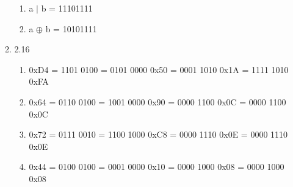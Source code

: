 \documentclass[11pt]{article}
\begin{document}
\begin{enumerate}
\begin{enumerate}
\begin{enumerate}
            \item a $| $ b = 11101111
            \item a $\oplus$ b = 10101111
        \end{enumerate}
        \item 2.16
        \begin{enumerate}
            \item 0xD4 = 1101 0100 = 0101 0000 0x50 = 0001 1010 0x1A = 1111 1010 0xFA
            \item 0x64 = 0110 0100 = 1001 0000 0x90 = 0000 1100 0x0C = 0000 1100 0x0C 
            \item 0x72 = 0111 0010 = 1100 1000 0xC8 = 0000 1110 0x0E = 0000 1110 0x0E
            \item 0x44 = 0100 0100 = 0001 0000 0x10 = 0000 1000 0x08 = 0000 1000 0x08
        \end{enumerate}
\end{enumerate}
\end{enumerate}
\end{document}
